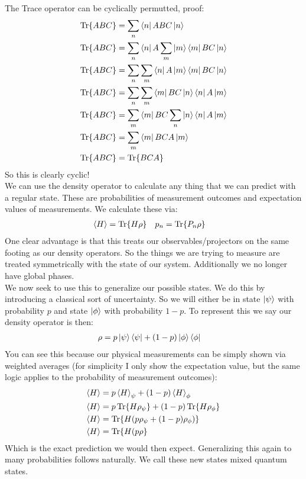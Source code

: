 The Trace operator can be cyclically permutted, proof:
\begin{align*}
	\Tr{ABC} &= \sum_n \bra{n}ABC\ket{n}\\
	\Tr{ABC} &= \sum_n \bra{n}A\sum_m\ket{m}\bra{m}BC\ket{n}\\
	\Tr{ABC} &= \sum_n \sum_m\bra{n}A\ket{m}\bra{m}BC\ket{n}\\
	\Tr{ABC} &=  \sum_n\sum_m\bra{m}BC\ket{n}\bra{n}A\ket{m}\\
	\Tr{ABC} &=  \sum_m\bra{m}BC\sum_n\ket{n}\bra{n}A\ket{m}\\
	\Tr{ABC} &=  \sum_m\bra{m}BCA\ket{m} \\
	\Tr{ABC} &=  \Tr{BCA}
\end{align*}
So this is clearly cyclic! \\
We can use the density operator to calculate any thing that we can predict with a regular state. These are probabilities of measurement outcomes and expectation values of measurements. We calculate these via:
\begin{align*}
	\expval{H} &= \Tr{H\rho} &
	p_n &= \Tr{P_n\rho}
\end{align*}
One clear advantage is that this treats our observables/projectors on the same footing as our density operators. So the things we are trying to measure are treated symmetrically with the state of our system. Additionally we no longer have global phases. \\
We now seek to use this to generalize our possible states. We do this by introducing a classical sort of uncertainty. So we will either be in state $\ket{\psi}$ with probability $p$ and state $\ket{\phi}$ with probability $1-p$.
To represent this we say our density operator is then:
\begin{align*}
	\rho &= p\ket{\psi}\bra{\psi} + (1-p)\ket{\phi}\bra{\phi}
\end{align*}
You can see this because our physical measurements can be simply shown via weighted averages (for simplicity I only show the expectation value, but the same logic applies to the probability of measurement outcomes):
\begin{align*}
	\expval{H} &= p\expval{H}_\psi + (1-p)\expval{H}_\phi \\
	\expval{H} &= p\Tr{H\rho_\psi} + (1-p)\Tr{H\rho_\phi} \\
	\expval{H} &= \Tr{H(p\rho_\psi + (1-p)\rho_\phi)} \\
	\expval{H} &= \Tr{H(p\rho}
\end{align*}
Which is the exact prediction we would then expect. Generalizing this again to many probabilities follows naturally. We call these new states mixed quantum states. \\
